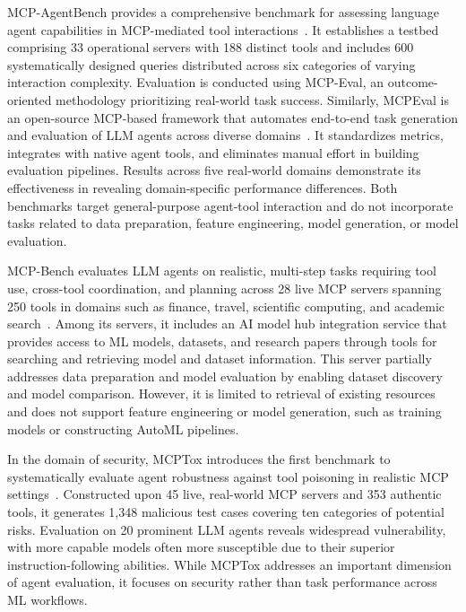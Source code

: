 \documentclass[
english,                 %
bibtex,                  %
includeExtraAbstracts, %
]{kththesis}
\numberwithin{listing}{chapter}
\begin{document}
\gls{MCP}-AgentBench provides a comprehensive benchmark for assessing language agent capabilities in \gls{MCP}-mediated tool interactions~\cite{guo_mcp-agentbench_2026}. It establishes a testbed comprising 33 operational servers with 188 distinct tools and includes 600 systematically designed queries distributed across six categories of varying interaction complexity. Evaluation is conducted using \gls{MCP}-Eval, an outcome-oriented methodology prioritizing real-world task success. Similarly, \gls{MCP}Eval is an open-source \gls{MCP}-based framework that automates end-to-end task generation and evaluation of \gls{LLM} agents across diverse domains~\cite{liu_mcpeval_2025}. It standardizes metrics, integrates with native agent tools, and eliminates manual effort in building evaluation pipelines. Results across five real-world domains demonstrate its effectiveness in revealing domain-specific performance differences. Both benchmarks target general-purpose agent-tool interaction and do not incorporate tasks related to data preparation, feature engineering, model generation, or model evaluation.

\gls{MCP}-Bench evaluates \gls{LLM} agents on realistic, multi-step tasks requiring tool use, cross-tool coordination, and planning across 28 live \gls{MCP} servers spanning 250 tools in domains such as finance, travel, scientific computing, and academic search~\cite{wang_mcp-bench_2026}. Among its servers, it includes an \gls{AI} model hub integration service that provides access to \gls{ML} models, datasets, and research papers through tools for searching and retrieving model and dataset information. This server partially addresses data preparation and model evaluation by enabling dataset discovery and model comparison. However, it is limited to retrieval of existing resources and does not support feature engineering or model generation, such as training models or constructing \gls{AutoML} pipelines.

In the domain of security, \gls{MCP}Tox introduces the first benchmark to systematically evaluate agent robustness against tool poisoning in realistic \gls{MCP} settings~\cite{wang_mcptox_2026}. Constructed upon 45 live, real-world \gls{MCP} servers and 353 authentic tools, it generates 1,348 malicious test cases covering ten categories of potential risks. Evaluation on 20 prominent \gls{LLM} agents reveals widespread vulnerability, with more capable models often more susceptible due to their superior instruction-following abilities. While \gls{MCP}Tox addresses an important dimension of agent evaluation, it focuses on security rather than task performance across \gls{ML} workflows.
\end{document}
